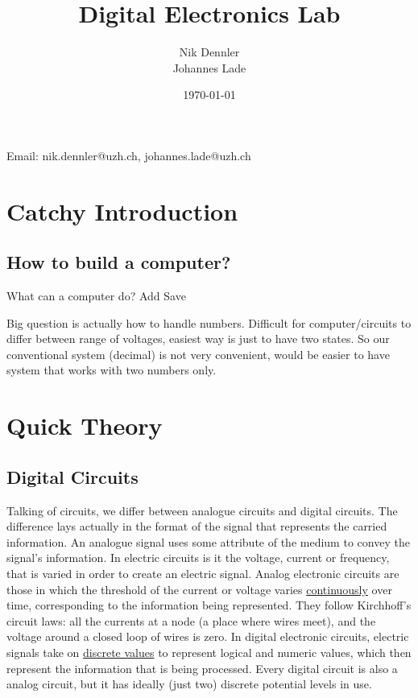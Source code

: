 \documentclass[10pt,a4paper]{article}
\author{Nik Dennler \\ Johannes Lade}
\title{Digital Electronics Lab}
\date{\today{}}
\begin{document}
	
\begin{titlepage}
	\maketitle
		\begin{center}
			Email: nik.dennler@uzh.ch, johannes.lade@uzh.ch
		\end{center}
	\thispagestyle{empty}
\end{titlepage}

\tableofcontents
\newpage

\section{Catchy Introduction}
\subsection{How to build a computer?}
What can a computer do?
Add
Save

Big question is actually how to handle numbers. Difficult for computer/circuits to differ between range of voltages, easiest way is just to have two states. So our conventional system (decimal) is not very convenient, would be easier to have system that works with two numbers only. 

\section{Quick Theory}
\subsection{Digital Circuits}
Talking of circuits, we differ between analogue circuits and digital circuits. The difference lays actually in the format of the signal that represents the carried information. \newline
An analogue signal uses some attribute of the medium to convey the signal's information. In electric circuits is it the voltage, current or frequency, that is varied in order to create an electric signal. Analog electronic circuits are those in which the threshold of the current or voltage varies \underline{continuously} over time, corresponding to the information being represented. They follow Kirchhoff's circuit laws: all the currents at a node (a place where wires meet), and the voltage around a closed loop of wires is zero. \newline
In digital electronic circuits, electric signals take on \underline{discrete values} to represent logical and numeric values, which then represent the information that is being processed. Every digital circuit is also a analog circuit, but it has ideally (just two) discrete potential levels in use. 
\end{document}
